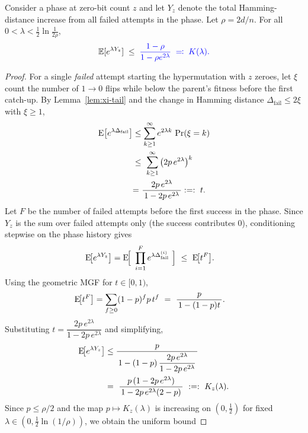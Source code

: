 \begin{lemma}%
	\label{lem:phase-mgf}
	Consider a phase at zero-bit count $z$ and let $Y_z$ denote the total 
	Hamming-distance increase from all failed attempts in the phase.  
	Let $\rho = 2d/n$.  
	For all $0<\lambda<\tfrac12\ln\frac{1}{2\rho}$,
	\[
	\mathbb{E}[e^{\lambda Y_z}] 
	\;\le\; 
	\textcolor{blue}{\frac{1-\rho}{1-\rho e^{2\lambda}}
	\;\eqqcolon\; K(\lambda).}
	\]
\end{lemma}

\begin{proof}
	For a single \emph{failed} attempt starting the hypermutation with $z$ zeroes, let $\xi$ count the number of $1\!\to 0$ flips while below the parent's fitness before the first catch-up.
	By Lemma~\ref{lem:xi-tail} and the change in Hamming distance $\Delta_{\mathrm{fail}}\le 2\xi$ with $\xi\ge 1$,
	\begin{align*}
		\EE\!\left[e^{\lambda \Delta_{\mathrm{fail}}}\right]
		&\le \sum_{k\ge 1}^{\infty} e^{2\lambda k}\,\Pr(\xi=k)
		\\ &\le\ \sum_{k\ge 1}^{\infty} \big(2p\,e^{2\lambda}\big)^{k}
		\\ &\textcolor{black}{=}\ \frac{2p\,e^{2\lambda}}{\,1-2p\,e^{2\lambda}\,}:=:\ t.
	\end{align*}
	Let $F$ be the number of failed attempts before the first success in the phase. %
	Since $Y_z$ is the sum over failed attempts only (the success contributes $0$), conditioning stepwise on the phase history gives
	\begin{align*}
		\text{E}\!\big[e^{\lambda Y_z}\big]
		&=\text{E}\!\Big[\ \prod_{i=1}^{F} e^{\lambda \Delta_{\mathrm{fail}}^{(i)}}\ \Big]
		\ \le\ \text{E}\!\big[t^{F}\big].
	\end{align*}
	Using the geometric MGF for $t\in[0,1)$,
	\begin{align*}
		\text{E}\!\big[t^{F}\big]
		&=
		 \sum_{f\ge 0} (1-p)^f p\, t^f
		\ =\ \frac{p}{\,1-(1-p)t\,}.
	\end{align*}
	Substituting $t=\dfrac{2p\,e^{2\lambda}}{1-2p\,e^{2\lambda}}$ and simplifying,
	\begin{align*}
		\EE\!\big[e^{\lambda Y_z}\big]
		&\le \frac{p}{\,1-(1-p)\,\dfrac{2p\,e^{2\lambda}}{1-2p\,e^{2\lambda}}\,}
		\\ &=\ \frac{p\,(1-2p\,e^{2\lambda})}{\,1-2p\,e^{2\lambda}(2-p)\,}
		\ :=:\ K_z(\lambda).
	\end{align*}
	Since $p\le \rho/2$ and the map $p\mapsto K_z(\lambda)$ is increasing on $(0,\tfrac12)$ for fixed $\lambda\in(0,\tfrac12\ln(1/\rho))$, we obtain the uniform bound

\end{proof}
